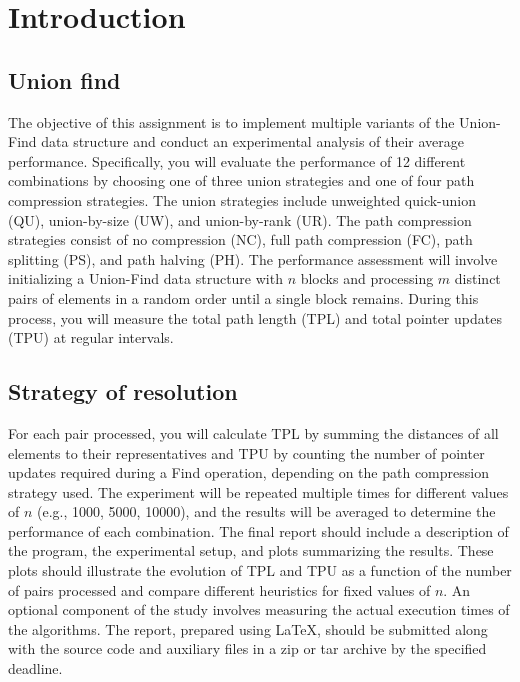 \documentclass[10pt,a4paper,hidelinks]{article}
\begin{document}

\tableofcontents

\section{Introduction}
\subsection{Union find}
The objective of this assignment is to implement multiple variants of the Union-Find data structure and conduct an experimental analysis of their average performance. Specifically, you will evaluate the performance of 12 different combinations by choosing one of three union strategies and one of four path compression strategies. The union strategies include unweighted quick-union (QU), union-by-size (UW), and union-by-rank (UR). The path compression strategies consist of no compression (NC), full path compression (FC), path splitting (PS), and path halving (PH). The performance assessment will involve initializing a Union-Find data structure with $n$ blocks and processing $m$ distinct pairs of elements in a random order until a single block remains. During this process, you will measure the total path length (TPL) and total pointer updates (TPU) at regular intervals.\\

\subsection{Strategy of resolution}
For each pair processed, you will calculate TPL by summing the distances of all elements to their representatives and TPU by counting the number of pointer updates required during a Find operation, depending on the path compression strategy used. The experiment will be repeated multiple times for different values of $n$ (e.g., 1000, 5000, 10000), and the results will be averaged to determine the performance of each combination. The final report should include a description of the program, the experimental setup, and plots summarizing the results. These plots should illustrate the evolution of TPL and TPU as a function of the number of pairs processed and compare different heuristics for fixed values of $n$. An optional component of the study involves measuring the actual execution times of the algorithms. The report, prepared using \LaTeX, should be submitted along with the source code and auxiliary files in a zip or tar archive by the specified deadline.
\end{document}
